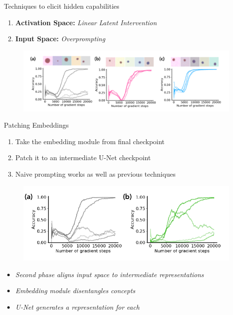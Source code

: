 \begin{frame}[t]{Techniques to elicit hidden capabilities}
\begin{enumerate}
    \item \textbf{Activation Space:} \textit{Linear Latent Intervention}
    \item \textbf{Input Space:} \textit{Overprompting}
\end{enumerate}
\begin{figure}
    \centering
    \includegraphics[width=0.7\linewidth]{figures/figure_6.png}
\end{figure}
\end{frame}



\begin{frame}[t]{Patching Embeddings}
\begin{enumerate}
    \item Take the embedding module from final checkpoint
    \item Patch it to an intermediate U-Net checkpoint
    \item Naive prompting works as well as previous techniques
\end{enumerate}

\begin{figure}
    \centering
    \includegraphics[width=0.5\linewidth]{figures/patching.png}
\end{figure}
\begin{itemize}
    \item \textit{Second phase aligns input space to intermediate representations}
    \item \textit{Embedding module disentangles concepts}
    \item \textit{U-Net generates a representation for each}
\end{itemize}
\end{frame}

